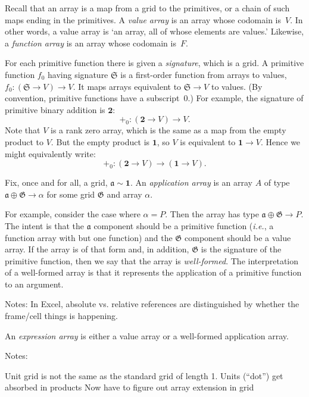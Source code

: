 \documentclass[11pt]{article}
\newcommand{\gr}[1]{\mathfrak{#1}}
\begin{document}
Recall that an array is a map from a grid to the primitives, or a chain of such
maps ending in the primitives. A \emph{value array} is an array whose codomain
is~$V$. In other words, a value array is `an array, all of whose elements are
values.' Likewise, a \emph{function array} is an array whose codomain is~$F$.

For each primitive function there is given a \emph{signature}, which is a
grid. A primitive function $f_0$ having signature $\gr{S}$ is a first-order
function from arrays to values, $f_0: (\gr{S} \to V) \to V$. It maps arrays
equivalent to $\gr{S}\to V$ to values. (By convention, primitive functions have a
subscript~0.) For example, the signature of primitive binary addition is
$\mathbf{2}$:
\begin{equation*}
+_0: (\mathbf{2} \to V) \to V.
\end{equation*}
Note that $V$ is a rank zero array, which is the same as a map from the empty
product to $V$. But the empty product is $\mathbf{1}$, so $V$ is equivalent to
$\mathbf{1}\to V$. Hence we might equivalently write:
\begin{equation*}
+_0: (\mathbf{2} \to V) \to (\mathbf{1} \to V).
\end{equation*}

Fix, once and for all, a grid, $\gr{a} \sim \mathbf{1}$. An \emph{application
array} is an array $A$ of type $\gr{a}\oplus\gr{G} \to \alpha$ for some grid
$\gr{G}$ and array $\alpha$. 

For example, consider the case where $\alpha = P$. Then the array has type
$\gr{a}\oplus\gr{G} \to P$. The intent is that the $\gr{a}$ component should be a
primitive function (\emph{i.e.}, a function array with but one function) and the
$\gr{G}$ component should be a value array. If the array is of that form and, in
addition, $\gr{G}$ is the signature of the primitive function, then we say that
the array is \emph{well-formed}. The interpretation of a well-formed array is
that it represents the application of a primitive function to an argument.



Notes: In Excel, absolute vs. relative references are distinguished by whether
the frame/cell things is happening.





An \emph{expression array} is either a value array or a well-formed application
array.

Notes:

Unit grid is not the same as the standard grid of length 1.
Units (``dot'') get absorbed in products
Now have to figure out array extension in grid
\end{document}
